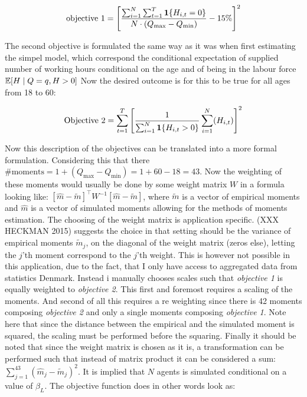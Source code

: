 \begin{equation}
    \text{objective 1} = \left[\frac{\sum_{i=1}^{N} \sum_{t=1}^T \mathbf{1}\{H_{i,t} = 0\}}{ N \cdot (Q_{\max} - Q_{\min} )} - 15\% \right]^2
\end{equation}

The second objective is formulated the same way as it was when first estimating the simpel model, which correspond the conditional expectation of supplied number of working hours conditional on the age and of being in the labour force $ \mathbb{E}[H \mid Q=q, H>0]$ Now the desired outcome is for this to be true for all ages from 18 to 60:


\begin{equation}
    \text{Objective 2} = \sum_{t=1}^{T} \left[ \frac{1}{\sum_{i=1}^{N} \mathbf{1}\{H_{i,t} > 0\}}\sum_{i=1}^N (H_{i,t})\right]^2
\end{equation}

Now this description of the objectives can be translated into a more formal formulation. Considering this that there $\text{\# moments}  = 1 + (Q_{\max} - Q_{\min}) = 1 + 60 - 18 = 43$. Now the weighting of these moments would usually be done by some weight matrix $W$ in a formula looking like: $[\hat{m} - \tilde{m}]^{\top} W^{-1} [\hat{m} - \tilde{m}]$, where $\tilde{m}$ is a vector of empirical moments and $\hat{m}$ is a vector of simulated moments allowing for the methods of moments estimation. The choosing of the weight matrix is application specific. \textcite{}(XXX HECKMAN 2015) suggests the choice in that setting should be the variance of empirical moments $\tilde{m}_j$, on the diagonal of the weight matrix (zeros else), letting the $j$'th moment correspond to the $j$'th weight. This is however not possible in this application, due to the fact, that I only have access to aggregated data from statistics Denmark. Instead i manually chooses scales such that \textit{objective 1} is equally weighted to \textit{objective 2}. This first and foremost requires a scaling of the moments. And second of all this requires a re weighting since there is 42 moments composing \textit{objective 2} and only a single moments composing \textit{objective 1}. Note here that since the distance between the empirical and the simulated moment is squared, the scaling must be performed before the squaring. Finally it should be noted that since the weight matrix is chosen as it is, a transformation can be performed such that instead of matrix product it can be considered a sum: $\sum_{j = 1}
^{43} ( \hat{m}_j - \tilde{m}_j )^2$. It is implied that $N$ agents is simulated conditional on a value of $\beta_L$. The objective function does in other words look as:

